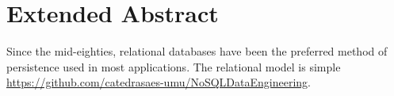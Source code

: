 \chapter*{Extended Abstract\label{cap:extended}}


Since the mid-eighties, relational databases have been the preferred method
of persistence used in most applications. The relational model is simple
\href{https://github.com/catedrasaes-umu/NoSQLDataEngineering}{\url{https://github.com/catedrasaes-umu/NoSQLDataEngineering}}.


